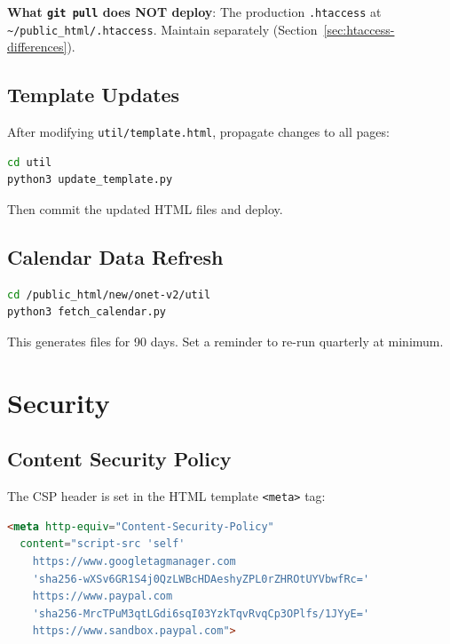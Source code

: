 \documentclass[12pt]{article}
\begin{document}
\textbf{What \texttt{git pull} does NOT deploy}: The production
\texttt{.htaccess} at \texttt{\textasciitilde/public\_html/.htaccess}.
Maintain separately (Section~\ref{sec:htaccess-differences}).
\nopagebreak

\subsection{Template Updates}

After modifying \texttt{util/template.html}, propagate changes to all pages:

\begin{lstlisting}[language=bash,numbers=none]
cd util
python3 update_template.py
\end{lstlisting}

Then commit the updated HTML files and deploy.

\subsection{Calendar Data Refresh}

\begin{lstlisting}[language=bash,numbers=none]
cd /public_html/new/onet-v2/util
python3 fetch_calendar.py
\end{lstlisting}

This generates files for 90 days. Set a reminder to re-run quarterly at minimum.

\section{Security}

\subsection{Content Security Policy}

The CSP header is set in the HTML template \texttt{<meta>} tag:

\begin{lstlisting}[language=HTML,numbers=none]
<meta http-equiv="Content-Security-Policy"
  content="script-src 'self'
    https://www.googletagmanager.com
    'sha256-wXSv6GR1S4j0QzLWBcHDAeshyZPL0rZHROtUYVbwfRc='
    https://www.paypal.com
    'sha256-MrcTPuM3qtLGdi6sqI03YzkTqvRvqCp3OPlfs/1JYyE='
    https://www.sandbox.paypal.com">
\end{lstlisting}
\end{document}
